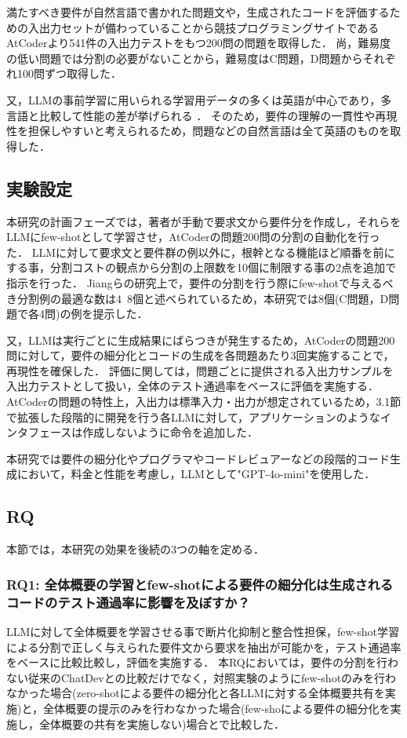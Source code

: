 \documentclass[submit,techrep,noauthor]{ipsj}
\begin{document}
満たすべき要件が自然言語で書かれた問題文や，生成されたコードを評価するための入出力セットが備わっていることから競技プログラミングサイトであるAtCoder\cite{AtCoder}より541件の入出力テストをもつ200問の問題を取得した．
尚，難易度の低い問題では分割の必要がないことから，難易度はC問題，D問題からそれぞれ100問ずつ取得した．

又，LLMの事前学習に用いられる学習用データの多くは英語が中心であり，多言語と比較して性能の差が挙げられる\cite{LLM_En} ．
そのため，要件の理解の一貫性や再現性を担保しやすいと考えられるため，問題などの自然言語は全て英語のものを取得した．

\subsection{実験設定}
本研究の計画フェーズでは，著者が手動で要求文から要件分を作成し，それらをLLMにfew-shotとして学習させ，AtCoderの問題200問の分割の自動化を行った．
LLMに対して要求文と要件群の例以外に，根幹となる機能ほど順番を前にする事，分割コストの観点から分割の上限数を10個に制限する事の2点を追加で指示を行った．
Jiangらの研究上で，要件の分割を行う際にfew-shotで与えるべき分割例の最適な数は4~8個と述べられているため，本研究では8個(C問題，D問題で各4問)の例を提示した．

又，LLMは実行ごとに生成結果にばらつきが発生するため，AtCoderの問題200問に対して，要件の細分化とコードの生成を各問題あたり3回実施することで，再現性を確保した．
評価に関しては，問題ごとに提供される入出力サンプルを入出力テストとして扱い，全体のテスト通過率をベースに評価を実施する．
AtCoderの問題の特性上，入出力は標準入力・出力が想定されているため，3.1節で拡張した段階的に開発を行う各LLMに対して，アプリケーションのようなインタフェースは作成しないように命令を追加した．

本研究では要件の細分化やプログラマやコードレビュアーなどの段階的コード生成において，料金と性能を考慮し，LLMとして"GPT-4o-mini"\cite{openai_gpt_4o_mini}を使用した．


\subsection{RQ}
本節では，本研究の効果を後続の3つの軸を定める．

\subsubsection{RQ1: 全体概要の学習とfew-shotによる要件の細分化は生成されるコードのテスト通過率に影響を及ぼすか？}
LLMに対して全体概要を学習させる事で断片化抑制と整合性担保，few-shot学習による分割で正しく与えられた要件文から要求を抽出が可能かを，テスト通過率をベースに比較比較し，評価を実施する．
本RQにおいては，要件の分割を行わない従来のChatDevとの比較だけでなく，対照実験のようにfew-shotのみを行わなかった場合(zero-shotによる要件の細分化と各LLMに対する全体概要共有を実施)と，全体概要の提示のみを行わなかった場合(few-shoによる要件の細分化を実施し，全体概要の共有を実施しない)場合とで比較した．
\end{document}
